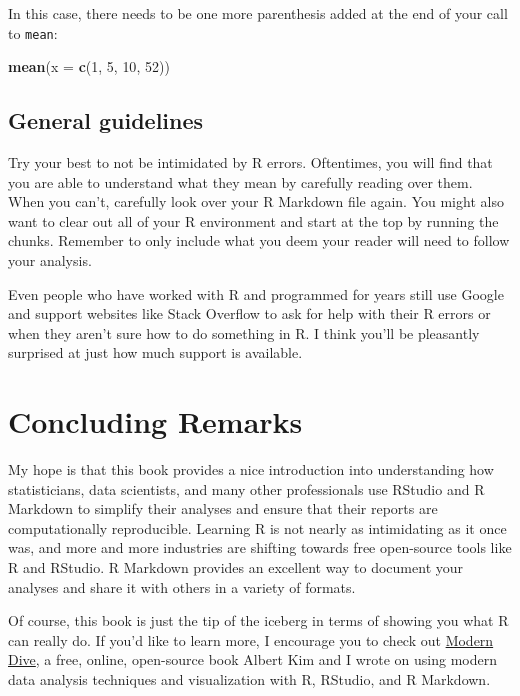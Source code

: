 \documentclass[]{tufte-book}
\newenvironment{Shaded}{\begin{snugshade}}{\end{snugshade}}
\newcommand{\DataTypeTok}[1]{\textcolor[rgb]{0.13,0.29,0.53}{#1}}
\newcommand{\DecValTok}[1]{\textcolor[rgb]{0.00,0.00,0.81}{#1}}
\newcommand{\KeywordTok}[1]{\textcolor[rgb]{0.13,0.29,0.53}{\textbf{#1}}}
\newcommand{\NormalTok}[1]{#1}
\begin{document}
In this case, there needs to be one more parenthesis added at the end of your call to \texttt{mean}:

\begin{Shaded}
\begin{Highlighting}[]
\KeywordTok{mean}\NormalTok{(}\DataTypeTok{x =} \KeywordTok{c}\NormalTok{(}\DecValTok{1}\NormalTok{, }\DecValTok{5}\NormalTok{, }\DecValTok{10}\NormalTok{, }\DecValTok{52}\NormalTok{))}
\end{Highlighting}
\end{Shaded}

\hypertarget{general-guidelines}{%
\section{General guidelines}\label{general-guidelines}}

Try your best to not be intimidated by R errors. Oftentimes, you will find that you are able to understand what they mean by carefully reading over them. When you can't, carefully look over your R Markdown file again. You might also want to clear out all of your R environment and start at the top by running the chunks. Remember to only include what you deem your reader will need to follow your analysis.

Even people who have worked with R and programmed for years still use Google and support websites like Stack Overflow to ask for help with their R errors or when they aren't sure how to do something in R. I think you'll be pleasantly surprised at just how much support is available.

\hypertarget{conclusion}{%
\chapter{Concluding Remarks}\label{conclusion}}

My hope is that this book provides a nice introduction into understanding how statisticians, data scientists, and many other professionals use RStudio and R Markdown to simplify their analyses and ensure that their reports are computationally reproducible. Learning R is not nearly as intimidating as it once was, and more and more industries are shifting towards free open-source tools like R and RStudio. R Markdown provides an excellent way to document your analyses and share it with others in a variety of formats.

Of course, this book is just the tip of the iceberg in terms of showing you what R can really do. If you'd like to learn more, I encourage you to check out \href{http://www.moderndive.com/}{Modern Dive}, a free, online, open-source book Albert Kim and I wrote on using modern data analysis techniques and visualization with R, RStudio, and R Markdown.
\end{document}
